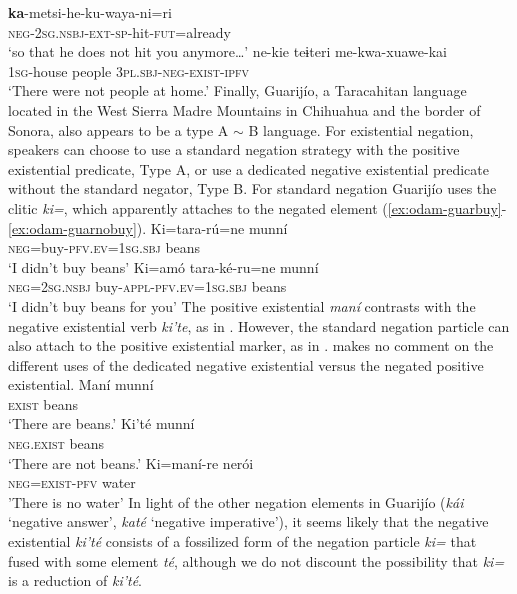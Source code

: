 \documentclass[output=paper]{langsci/langscibook}
\begin{document}
\gll \textbf{ka}-metsi-he-ku-waya-ni=ri\\
\textsc{neg-2sg.nsbj-ext-sp}-hit-\textsc{fut}=already\\
\glt ‘so that he does not hit you anymore…’ \citep[54]{bierge2017}
\z 
\ea
\label{ex:odam-notpeo}
\gll ne-kie teɨteri me-kwa-xuawe-kai\\
\textsc{1sg}-house people \textsc{3pl.sbj-neg-exist-ipfv}\\
\glt ‘There were not people at home.’ \citep[115]{bierge2017}
\z
Finally, Guarijío, a Taracahitan language located in the West Sierra Madre Mountains in Chihuahua and the border of Sonora, also appears to be a type A $\sim$ B language. For existential negation, speakers can choose to use a standard negation strategy with the positive existential predicate, Type A, or use a dedicated negative existential predicate without the standard negator, Type B. For standard negation Guarijío uses the clitic \emph{ki=}, which apparently attaches to the negated element (\ref{ex:odam-guarbuy}-\ref{ex:odam-guarnobuy}).
\ea
\label{ex:odam-guarbuy}
\gll Ki=tara-rú=ne			munní\\
\textsc{neg}=buy-\textsc{pfv.ev=1sg.sbj}	beans\\
\glt ‘I didn’t buy beans’ \citep[192]{armendariz2006}
\z 
\ea
\label{ex:odam-guarnobuy}
\gll Ki=amó	tara-ké-ru=ne			munní\\
\textsc{neg=2sg.nsbj}	buy-\textsc{appl-pfv.ev=1sg.sbj}	beans\\
\glt ‘I didn’t buy beans for you’ \citep[193]{armendariz2006}
\z 
The positive existential \emph{maní}  contrasts with the negative existential verb \emph{ki’te}, as in . However, the standard negation particle can also attach to the positive existential marker, as in . \citet{armendariz2006} makes no comment on the different uses of the dedicated negative existential versus the negated positive existential.
\ea
\label{ex:odam-guarbean}
\gll Maní	munní\\
\textsc{exist} 	beans\\
\glt ‘There are beans.’ \citep[191]{armendariz2006}
\z 
\ea
\label{ex:odam-guarnobean}
\gll Ki’té		munní\\
\textsc{neg.exist}	beans\\
\glt ‘There are not beans.’ \citep[191]{armendariz2006}
\z 
\ea
\label{ex:odam-guarwater}
\gll Ki=maní-re nerói\\
\textsc{neg=exist-pfv} water\\
\glt 'There is no water' \citep[115]{armendariz2006}
\z
In light of the other negation elements in Guarij\'io (\emph{kái} `negative answer', \emph{katé} `negative imperative'), it seems likely that the negative existential \emph{ki’té} consists of a fossilized form of the negation particle \emph{ki=} that fused with some element \emph{té}, although we do not discount the possibility that \emph{ki=} is a reduction of \emph{ki't\'e}.
\end{document}
